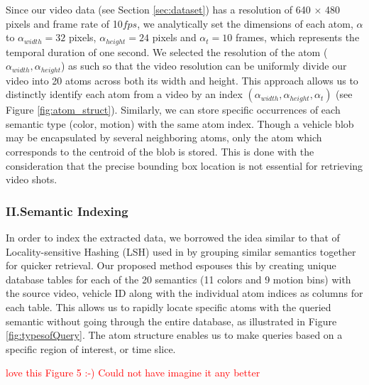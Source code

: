 \documentclass[runningheads]{llncs}
\newcommand{\ian}[1]{\textcolor{red}{#1}}
\newcommand{\ian}[1]{}   %
\begin{document}
Since our video data (see Section \ref{sec:dataset}) has a resolution of 640 $\times$ 480 pixels and frame rate of 10$fps$, we analytically set the dimensions of each atom, $\alpha$ to $\alpha_{width} =32$ pixels, $\alpha_{height} = 24$ pixels and $\alpha_{t} = 10$ frames, which represents the temporal duration of one second. We selected the resolution of the atom ($\alpha_{width},\alpha_{height}$) as such so that the video resolution can be uniformly divide our video into 20 atoms across both its width and height. This approach allows us to distinctly identify each atom from a video by an index $(\alpha_{width},\alpha_{height},\alpha_{t})$ (see Figure \ref{fig:atom_struct}). Similarly, we can store specific occurrences of each semantic type (color, motion) with the same atom index. Though a vehicle blob may be encapsulated by several neighboring atoms, only the atom which corresponds to the centroid of the blob is stored. This is done with the consideration that 
the precise bounding box location is not essential for retrieving video shots.
 
 \subsubsection{II.\quad Semantic Indexing} 
In order to index the extracted data, we borrowed the idea similar to that of Locality-sensitive Hashing (LSH) used in \cite{castanon2016retrieval} by grouping similar semantics together for quicker retrieval. Our proposed method espouses this by creating unique database tables for each of the 20 semantics (11 colors and 9 motion bins) with the source video, vehicle ID along with the individual atom indices as columns for each table. This allows us to rapidly locate specific atoms with the queried semantic without going through the entire database, as illustrated in Figure \ref{fig:typesofQuery}. The atom structure enables us to make queries based on a specific region of interest, or time slice.


\ian{love this Figure 5 :-)  Could not have imagine it any better}
\end{document}
